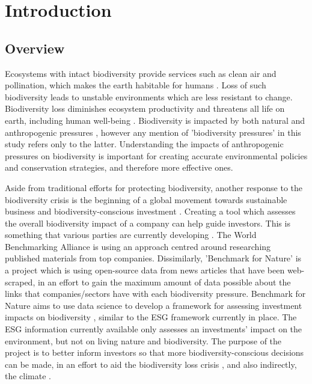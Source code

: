 \documentclass[11pt, a4paper, titlepage]{article}
\begin{document}
	\newpage
	\tableofcontents
	
	\newpage
	
    \section*{Introduction}
    	
    \subsection*{Overview}
   	 Ecosystems with intact biodiversity provide services such as clean air and pollination, which makes the earth habitable for humans \citep{leemans2003millennium}. Loss of such biodiversity leads to unstable environments which are less resistant to change. Biodiversity loss diminishes ecosystem productivity \citep{duffy2017biodiversity} and threatens all life on earth, including human well-being \citep{diaz2006biodiversity}. Biodiversity is impacted by both natural and anthropogenic pressures \citep{nobel2020anthropogenic}, however any mention of 'biodiversity pressures' in this study refers only to the latter. Understanding the impacts of anthropogenic pressures on biodiversity is important for creating accurate environmental policies and conservation strategies, and therefore more effective ones. \newline
   	 
   	 Aside from traditional efforts for protecting biodiversity, another response to the biodiversity crisis \citep{ogar2020science} is the beginning of a global movement towards sustainable business and biodiversity-conscious investment \citep{pri2020}\citep{worldeconomicforum2020}\citep{wwf2020}. Creating a tool which assesses the overall biodiversity impact of a company can help guide investors. This is something that various parties are currently developing \citep{worldbenchmarkingalliance_2022}\citep{iccs_2020}. The World Benchmarking Alliance is using an approach centred around researching published materials from top companies. Dissimilarly, 'Benchmark for Nature' is a project which is using open-source data from news articles that have been web-scraped, in an effort to gain the maximum amount of data possible about the links that companies/sectors have with each biodiversity pressure. Benchmark for Nature aims to use data science to develop a framework for assessing investment impacts on biodiversity \citep{iccs_2020}, similar to the ESG framework currently in place. The ESG information currently available only assesses an investments' impact on the environment, but not on living nature and biodiversity. The purpose of the project is to better inform investors so that more biodiversity-conscious decisions can be made, in an effort to aid the biodiversity loss crisis \citep{gasu2021review}, and also indirectly, the climate \citep{shin2022actions}.   \newline
   	 
\end{document}

